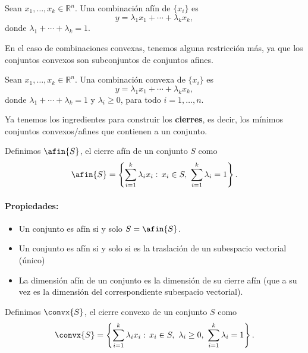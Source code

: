 \begin{defn}

Sean $x_1,\ldots,x_k \in\mathbb{R}^n$. Una combinación afín de $\{x_i\}$ es
\[
y = \lambda_1 x_1+\cdots +\lambda_k x_k,
\]
donde $\lambda_1+\cdots +\lambda_k=1$.
\end{defn}


En el caso de combinaciones convexas, tenemos alguna restricción más, ya que los conjuntos convexos son subconjuntos de conjuntos afines.

\begin{defn}
Sean $x_1,\ldots,x_k \in\mathbb{R}^n$. Una combinación convexa de $\{x_i\}$ es
\[
y = \lambda_1 x_1+\cdots +\lambda_k x_k,
\]
donde $\lambda_1+\cdots +\lambda_k=1$ y $\lambda_i \geq 0$, para todo $i=1,\ldots,n$.
\end{defn}


Ya tenemos los ingredientes para construir los \textbf{cierres}, es decir, los mínimos conjuntos convexos/afines que contienen a un conjunto.


\begin{defn}
Definimos $\afin{S}$, el cierre afín de un conjunto $S$ como
\[
\afin{S} = \left\{\sum_{i=1}^k \lambda_i x_i:\, x_i\in S,\  \sum_{i=1}^k \lambda_i = 1\right\}.
\]
\end{defn}

\paragraph{Propiedades:}
\begin{itemize}
\item Un conjunto es afín si y solo $S=\afin{S}$.

\item Un conjunto es afín si y solo si es la traslación de un subespacio vectorial (único)

\item La dimensión afín de un conjunto es la dimensión de su cierre afín (que a su vez es la dimensión del correspondiente subespacio vectorial).
\end{itemize}




\begin{defn}
Definimos $\convx{S}$, el cierre convexo de un conjunto $S$ como
\[
\convx{S} = \left\{\sum_{i=1}^k \lambda_i x_i:\, x_i\in S,\ \lambda_i\geq 0,\ \sum_{i=1}^k \lambda_i = 1\right\}.
\]
\end{defn}

